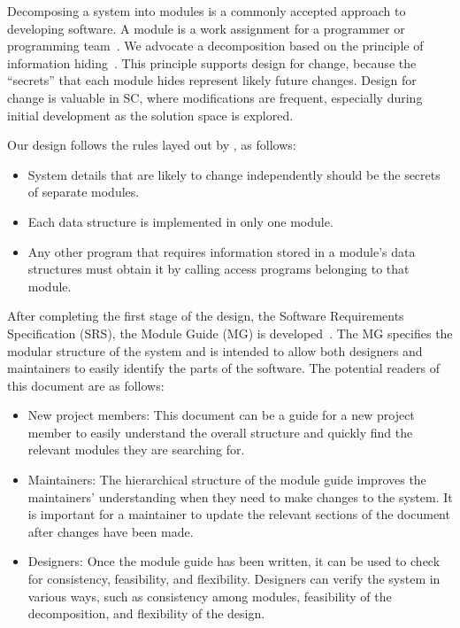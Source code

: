 \documentclass[12pt, titlepage]{article}
\begin{document}
Decomposing a system into modules is a commonly accepted approach to developing
software.  A module is a work assignment for a programmer or programming
team~\citep{ParnasEtAl1984}.  We advocate a decomposition
based on the principle of information hiding~\citep{Parnas1972a}.  This
principle supports design for change, because the ``secrets'' that each module
hides represent likely future changes.  Design for change is valuable in SC,
where modifications are frequent, especially during initial development as the
solution space is explored.  

Our design follows the rules layed out by \citet{ParnasEtAl1984}, as follows:
\begin{itemize}
\item System details that are likely to change independently should be the
  secrets of separate modules.
\item Each data structure is implemented in only one module.
\item Any other program that requires information stored in a module's data
  structures must obtain it by calling access programs belonging to that module.
\end{itemize}

After completing the first stage of the design, the Software Requirements
Specification (SRS), the Module Guide (MG) is developed~\citep{ParnasEtAl1984}. The MG
specifies the modular structure of the system and is intended to allow both
designers and maintainers to easily identify the parts of the software.  The
potential readers of this document are as follows:

\begin{itemize}
\item New project members: This document can be a guide for a new project member
  to easily understand the overall structure and quickly find the
  relevant modules they are searching for.
\item Maintainers: The hierarchical structure of the module guide improves the
  maintainers' understanding when they need to make changes to the system. It is
  important for a maintainer to update the relevant sections of the document
  after changes have been made.
\item Designers: Once the module guide has been written, it can be used to
  check for consistency, feasibility, and flexibility. Designers can verify the
  system in various ways, such as consistency among modules, feasibility of the
  decomposition, and flexibility of the design.
\end{itemize}
\end{document}
